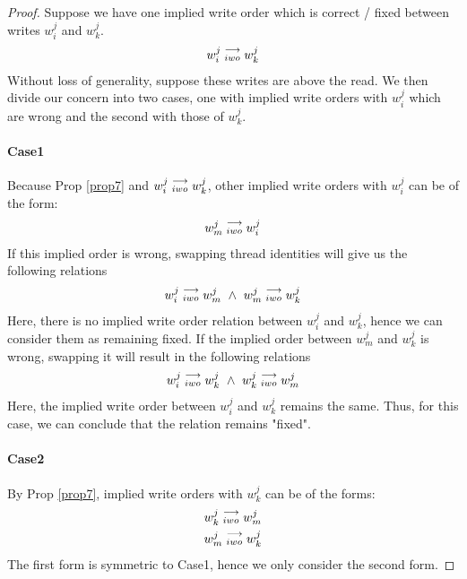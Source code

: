        \begin{proof}
            Suppose we have one implied write order which is correct / fixed between writes $w_i^j$ and $w_k^j$.
            \begin{align*}
                w_i^j\stackrel{\longrightarrow}{_{iwo}}w_k^j
            \end{align*}
            Without loss of generality, suppose these writes are above the read. We then divide our concern into two cases, one with implied write orders with $w_i^j$ which are wrong and the second with those of $w_k^j$.

            \paragraph{Case1} 
                Because Prop \ref{prop7} and $w_i^j\stackrel{\longrightarrow}{_{iwo}}w_k^j$, other implied write orders with $w_i^j$ can be of the form:
                \begin{align*}
                    w_m^j\stackrel{\longrightarrow}{_{iwo}}w_i^j
                \end{align*}
                If this implied order is wrong, swapping thread identities will  give us the following relations 
                \begin{align*}
                    \reln{w_i^j}{iwo}{w_m^j} \ \wedge \ \reln{w_m^j}{iwo}{w_k^j}  
                \end{align*}  
                Here, there is no implied write order relation between $w_i^j$ and $w_k^j$, hence we can consider them as remaining fixed. 
                If the implied order between $w_m^j$ and $w_k^j$ is wrong, swapping it will result in the following relations
                \begin{align*}
                    \reln{w_i^j}{iwo}{w_k^j} \ \wedge \ \reln{w_k^j}{iwo}{w_m^j}  
                \end{align*}  
                Here, the implied write order between $w_i^j$ and $w_k^j$ remains the same. Thus, for this case, we can conclude that the   relation remains "fixed".

            \paragraph{Case2} 
                By Prop \ref{prop7}, implied write orders with $w_k^j$ can be of the forms:
                \begin{align*}
                    w_k^j\stackrel{\longrightarrow}{_{iwo}}w_m^j \\
                    w_m^j\stackrel{\longrightarrow}{_{iwo}}w_k^j 
                \end{align*} 
                The first form is symmetric to Case1, hence we only consider the second form. 


\end{proof}
